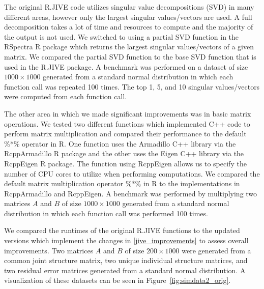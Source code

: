 \documentclass[unnumsec,webpdf,contemporary,large]{oup-authoring-template}%
\theoremstyle{thmstyleone}%
\theoremstyle{thmstyletwo}%
\theoremstyle{thmstylethree}%
\begin{document}
The original R.JIVE code utilizes singular value decompositions (SVD) in many different areas, however only the largest singular values/vectors are used. A full decomposition takes a lot of time and resources to compute and the majority of the output is not used. We switched to using a partial SVD function in the RSpectra R package which returns the largest singular values/vectors of a given matrix.
We compared the partial SVD function to the base SVD function that is used in the R.JIVE package. A benchmark was performed on a dataset of size $1000 \times 1000$ generated from a standard normal distribution in which each function call was repeated 100 times. The top 1, 5, and 10 singular values/vectors were computed from each function call.

The other area in which we made significant improvements was in basic matrix operations. We tested two different functions which implemented C++ code to perform matrix multiplication and compared their performance to the default \%*\% operator in R. One function uses the Armadillo C++ library via the RcppArmadillo R package \citep{eddelbuettel2014rcpparmadillo} and the other uses the Eigen C++ library via the RcppEigen R package. The function using RcppEigen allows us to specify the number of CPU cores to utilize when performing computations.
We compared the default matrix multiplication operator \%*\% in R to the implementations in RcppArmadillo and RcppEigen. A benchmark was performed by multiplying two matrices $A$ and $B$ of size $1000 \times 1000$ generated from a standard normal distribution in which each function call was performed 100 times.

We compared the runtimes of the original R.JIVE functions to the updated versions which implement the changes in \ref{jive_improvements} to assess overall improvements. Two matrices $A$ and $B$ of size $200 \times 1000$ were generated from a common joint structure matrix, two unique individual structure matrices, and two residual error matrices generated from a standard normal distribution. A visualization of these datasets can be seen in Figure~\ref{fig:simdata2_orig}.
\end{document}
